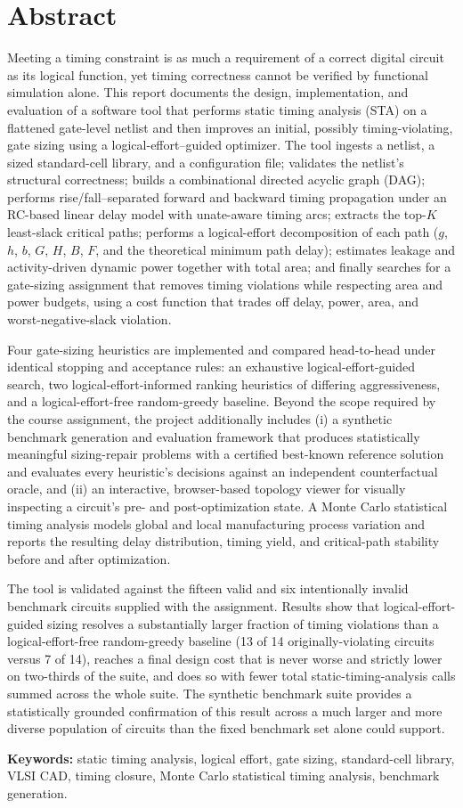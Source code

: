 \chapter*{Abstract}

Meeting a timing constraint is as much a requirement of a correct digital
circuit as its logical function, yet timing correctness cannot be verified by
functional simulation alone. This report documents the design,
implementation, and evaluation of a software tool that performs
static timing analysis (STA) on a flattened gate-level netlist and then
improves an initial, possibly timing-violating, gate sizing using a
logical-effort--guided optimizer. The tool ingests a netlist, a sized
standard-cell library, and a configuration file; validates the netlist's
structural correctness; builds a combinational directed acyclic graph (DAG);
performs rise/fall--separated forward and backward timing propagation under
an RC-based linear delay model with unate-aware timing arcs; extracts the
top-$K$ least-slack critical paths; performs a logical-effort decomposition
of each path ($g$, $h$, $b$, $G$, $H$, $B$, $F$, and the theoretical minimum
path delay); estimates leakage and activity-driven dynamic power together
with total area; and finally searches for a gate-sizing assignment that
removes timing violations while respecting area and power budgets, using a
cost function that trades off delay, power, area, and worst-negative-slack
violation.

Four gate-sizing heuristics are implemented and compared head-to-head under
identical stopping and acceptance rules: an exhaustive logical-effort-guided
search, two logical-effort-informed ranking heuristics of differing
aggressiveness, and a logical-effort-free random-greedy baseline. Beyond the
scope required by the course assignment, the project additionally includes
(i) a synthetic benchmark generation and evaluation framework that produces
statistically meaningful sizing-repair problems with a certified best-known
reference solution and evaluates every heuristic's decisions against an
independent counterfactual oracle, and (ii) an interactive, browser-based
topology viewer for visually inspecting a circuit's pre- and
post-optimization state. A Monte Carlo statistical timing analysis models
global and local manufacturing process variation and reports the resulting
delay distribution, timing yield, and critical-path stability before and
after optimization.

The tool is validated against the fifteen valid and six intentionally
invalid benchmark circuits supplied with the assignment. Results show that
logical-effort-guided sizing resolves a substantially larger fraction of
timing violations than a logical-effort-free random-greedy baseline
(13 of 14 originally-violating circuits versus 7 of 14), reaches a final
design cost that is never worse and strictly lower on two-thirds of the
suite, and does so with fewer total static-timing-analysis calls summed
across the whole suite. The synthetic benchmark suite provides a statistically
grounded confirmation of this result across a much larger and more diverse
population of circuits than the fixed benchmark set alone could support.

\vfill
\noindent\textbf{Keywords:} static timing analysis, logical effort, gate
sizing, standard-cell library, VLSI CAD, timing closure, Monte Carlo
statistical timing analysis, benchmark generation.

\clearpage